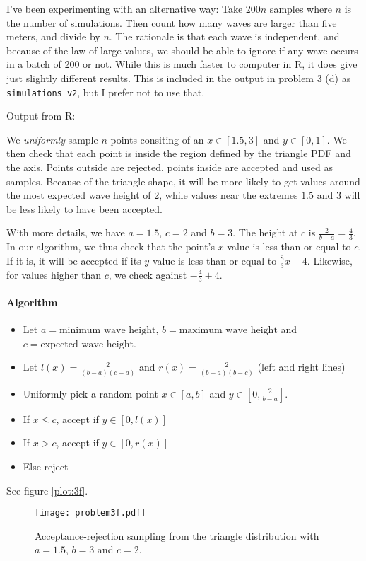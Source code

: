 \documentclass[a4paper,english,12pt]{article}
\begin{document}
I've been experimenting with an alternative way: Take $200n$ samples where $n$
is the number of simulations. Then count how many waves are larger than five
meters, and divide by $n$. The rationale is that each wave is independent, and
because of the law of large values, we should be able to ignore if any wave
occurs in a batch of 200 or not. While this is much faster to computer in R, it
does give just slightly different results. This is included in the output in
problem 3 (d) as \texttt{simulations v2}, but I prefer not to use that.

Output from R:

We \textit{uniformly} sample $n$ points consiting of an $x \in [1.5, 3]$ and $y
\in [0, 1]$. We then check that each point is inside the region defined by the
triangle PDF and the axis. Points outside are rejected, points inside are
accepted and used as samples.  Because of the triangle shape, it will be more
likely to get values around the most expected wave height of 2, while values
near the extremes $1.5$ and $3$ will be less likely to have been accepted.

With more details, we have $a=1.5$, $c=2$ and $b=3$. The height at $c$ is
$\frac{2}{b-a} = \frac{4}{3}$. In our algorithm, we thus check that the point's $x$
value is less than or equal to $c$. If it is, it will be accepted if its $y$
value is less than or equal to $\frac{8}{3}x - 4$. Likewise, for values higher
than $c$, we check against $-\frac{4}{3} + 4$.

\paragraph{Algorithm}
\begin{itemize}
  \item Let $a=\text{minimum wave height}$, $b=\text{maximum wave height}$ and
    $c=\text{expected wave height}$.
  \item Let $l(x) = \frac{2}{(b-a)(c-a)}$  and $r(x) = \frac{2}{(b-a)(b-c)}$
    (left and right lines)
  \item Uniformly pick a random point $x \in [a, b]$ and $y \in [0, \frac{2}{b-a}]$.
  \item If $x \leqslant c$, accept if $y \in \left[0, l(x)\right]$
  \item If $x > c$, accept if $y \in \left[0, r(x)\right]$
  \item Else reject
\end{itemize}

See figure \vref{plot:3f}.

\begin{figure}
  \centering
  \texttt{[image: problem3f.pdf]}
  \caption{Acceptance-rejection sampling from the triangle distribution with
  $a=1.5$, $b=3$ and $c=2$.}
  \label{plot:3f}
\end{figure}




\end{document}
